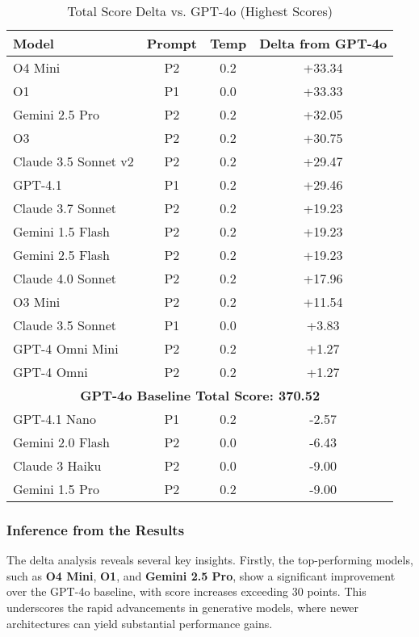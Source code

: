 \begin{table}[!htbp]
\centering
\caption{Total Score Delta vs. GPT-4o (Highest Scores)}
\label{tab:deepeval_delta_results}
\begin{tabular}{|l|c|c|c|}
\hline
\textbf{Model} & \textbf{Prompt} & \textbf{Temp} & \textbf{Delta from GPT-4o} \\
\hline
O4 Mini & P2 & 0.2 & +33.34 \\
O1 & P1 & 0.0 & +33.33 \\
Gemini 2.5 Pro & P2 & 0.2 & +32.05 \\
O3 & P2 & 0.2 & +30.75 \\
Claude 3.5 Sonnet v2 & P2 & 0.2 & +29.47 \\
GPT-4.1 & P1 & 0.2 & +29.46 \\
Claude 3.7 Sonnet & P2 & 0.2 & +19.23 \\
Gemini 1.5 Flash & P2 & 0.2 & +19.23 \\
Gemini 2.5 Flash & P2 & 0.2 & +19.23 \\
Claude 4.0 Sonnet & P2 & 0.2 & +17.96 \\
O3 Mini & P2 & 0.2 & +11.54 \\
Claude 3.5 Sonnet & P1 & 0.0 & +3.83 \\
GPT-4 Omni Mini & P2 & 0.2 & +1.27 \\
GPT-4 Omni & P2 & 0.2 & +1.27 \\
\hline
\multicolumn{4}{|c|}{\textbf{GPT-4o Baseline Total Score: 370.52}} \\
\hline
GPT-4.1 Nano & P1 & 0.2 & -2.57 \\
Gemini 2.0 Flash & P2 & 0.0 & -6.43 \\
Claude 3 Haiku & P2 & 0.0 & -9.00 \\
Gemini 1.5 Pro & P2 & 0.2 & -9.00 \\
\hline
\end{tabular}
\end{table}

\subsubsection{Inference from the Results}
The delta analysis reveals several key insights. Firstly, the top-performing models, such as \textbf{O4 Mini}, \textbf{O1}, and \textbf{Gemini 2.5 Pro}, show a significant improvement over the GPT-4o baseline, with score increases exceeding 30 points. This underscores the rapid advancements in generative models, where newer architectures can yield substantial performance gains.

